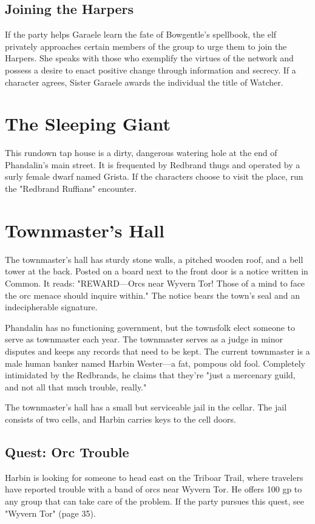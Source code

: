 \documentclass[10pt,a4paper,twoside,bg=print,twocolumn,openany,nodeprecatedcode]{dndbook}
\begin{document}
\subsection{Joining the Harpers}
If the party helps Garaele learn the fate of Bowgentle's spellbook, the elf privately approaches certain members of the group to urge them to join the Harpers. She speaks with those who exemplify the virtues of the network and possess a desire to enact positive change through information and secrecy. If a character agrees, Sister Garaele awards the individual the title of Watcher.

\section{The Sleeping Giant}
This rundown tap house is a dirty, dangerous watering hole at the end of Phandalin's main street. It is frequented by Redbrand thugs and operated by a surly female dwarf named Grista. If the characters choose to visit the place, run the "Redbrand Ruffians" encounter.

\section{Townmaster's Hall}
\begin{DndReadAloud}{}
The townmaster's hall has sturdy stone walls, a pitched wooden roof, and a bell tower at the back. Posted on a board next to the front door is a notice written in Common. It reads: "REWARD—Orcs near Wyvern Tor! Those of a mind to face the orc menace should inquire within." The notice bears the town's seal and an indecipherable signature.

\end{DndReadAloud}

Phandalin has no functioning government, but the townsfolk elect someone to serve as townmaster each year. The townmaster serves as a judge in minor disputes and keeps any records that need to be kept. The current townmaster is a male human banker named Harbin Wester—a fat, pompous old fool. Completely intimidated by the Redbrands, he claims that they're "just a mercenary guild, and not all that much trouble, really."

The townmaster's hall has a small but serviceable jail in the cellar. The jail consists of two cells, and Harbin carries keys to the cell doors.

\subsection{Quest: Orc Trouble}
Harbin is looking for someone to head east on the Triboar Trail, where travelers have reported trouble with a band of orcs near Wyvern Tor. He offers 100 gp to any group that can take care of the problem. If the party pursues this quest, see "Wyvern Tor" (page 35).
\end{document}
